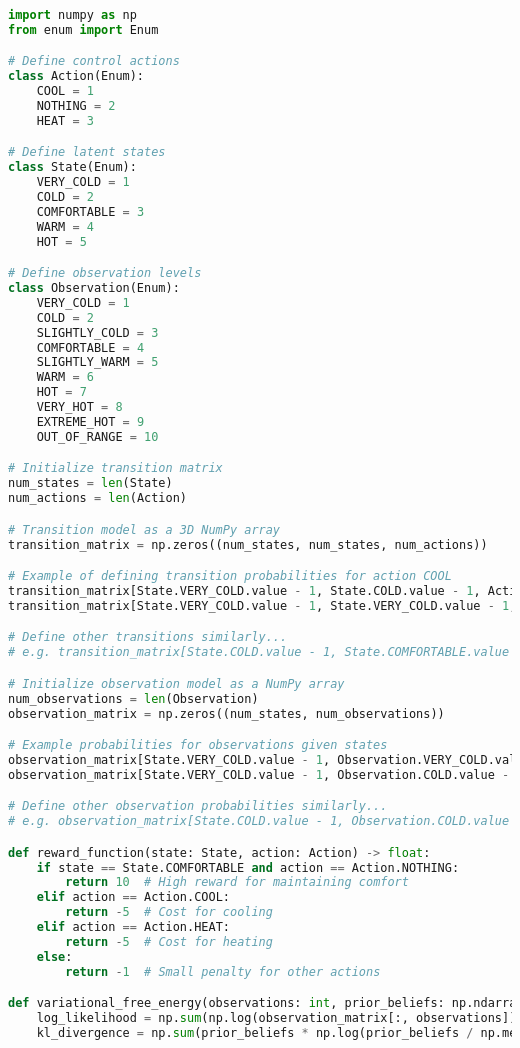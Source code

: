 \documentclass[11pt,a4paper]{article}
\begin{document}
\begin{lstlisting}[language=Python, caption={Full implementation code}]
import numpy as np
from enum import Enum

# Define control actions
class Action(Enum):
    COOL = 1
    NOTHING = 2
    HEAT = 3

# Define latent states
class State(Enum):
    VERY_COLD = 1
    COLD = 2
    COMFORTABLE = 3
    WARM = 4
    HOT = 5

# Define observation levels
class Observation(Enum):
    VERY_COLD = 1
    COLD = 2
    SLIGHTLY_COLD = 3
    COMFORTABLE = 4
    SLIGHTLY_WARM = 5
    WARM = 6
    HOT = 7
    VERY_HOT = 8
    EXTREME_HOT = 9
    OUT_OF_RANGE = 10

# Initialize transition matrix
num_states = len(State)
num_actions = len(Action)

# Transition model as a 3D NumPy array
transition_matrix = np.zeros((num_states, num_states, num_actions))

# Example of defining transition probabilities for action COOL
transition_matrix[State.VERY_COLD.value - 1, State.COLD.value - 1, Action.COOL.value - 1] = 0.8
transition_matrix[State.VERY_COLD.value - 1, State.VERY_COLD.value - 1, Action.COOL.value - 1] = 0.2

# Define other transitions similarly...
# e.g. transition_matrix[State.COLD.value - 1, State.COMFORTABLE.value - 1, Action.NOTHING.value - 1] = 0.7

# Initialize observation model as a NumPy array
num_observations = len(Observation)
observation_matrix = np.zeros((num_states, num_observations))

# Example probabilities for observations given states
observation_matrix[State.VERY_COLD.value - 1, Observation.VERY_COLD.value - 1] = 0.9
observation_matrix[State.VERY_COLD.value - 1, Observation.COLD.value - 1] = 0.1

# Define other observation probabilities similarly...
# e.g. observation_matrix[State.COLD.value - 1, Observation.COLD.value - 1] = 0.8

def reward_function(state: State, action: Action) -> float:
    if state == State.COMFORTABLE and action == Action.NOTHING:
        return 10  # High reward for maintaining comfort
    elif action == Action.COOL:
        return -5  # Cost for cooling
    elif action == Action.HEAT:
        return -5  # Cost for heating
    else:
        return -1  # Small penalty for other actions

def variational_free_energy(observations: int, prior_beliefs: np.ndarray) -> float:
    log_likelihood = np.sum(np.log(observation_matrix[:, observations]))
    kl_divergence = np.sum(prior_beliefs * np.log(prior_beliefs / np.mean(prior_beliefs)))


\end{lstlisting}
\end{document}
